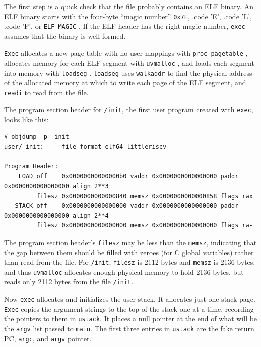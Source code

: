 The first step is a quick check that the file probably contains an
ELF binary.
An ELF binary starts with the four-byte ``magic number''
\lstinline{0x7F},
.code 'E',
.code 'L',
.code 'F',
or
\lstinline{ELF_MAGIC}
.
If the ELF header has the right magic number,
\lstinline{exec}
assumes that the binary is well-formed.

\lstinline{Exec}
allocates a new page table with no user mappings with
\lstinline{proc_pagetable}
,
allocates memory for each ELF segment with
\lstinline{uvmalloc}
,
and loads each segment into memory with
\lstinline{loadseg}
.
\lstinline{loadseg}
uses
\lstinline{walkaddr}
to find the physical address of the allocated memory at which to write
each page of the ELF segment, and
\lstinline{readi}
to read from the file.

The program section header for
\lstinline{/init},
the first user program created with
\lstinline{exec},
looks like this:
\begin{lstlisting}[]
# objdump -p _init
user/_init:     file format elf64-littleriscv

Program Header:
    LOAD off    0x00000000000000b0 vaddr 0x0000000000000000 paddr 0x0000000000000000 align 2**3
         filesz 0x0000000000000840 memsz 0x0000000000000858 flags rwx
   STACK off    0x0000000000000000 vaddr 0x0000000000000000 paddr 0x0000000000000000 align 2**4
         filesz 0x0000000000000000 memsz 0x0000000000000000 flags rw-
\end{lstlisting}

The program section header's
\lstinline{filesz}
may be less than the
\lstinline{memsz},
indicating that the gap between them should be filled
with zeroes (for C global variables) rather than read from the file.
For
\lstinline{/init},
\lstinline{filesz}
is 2112 bytes and
\lstinline{memsz}
is 2136 bytes,
and thus
\lstinline{uvmalloc}
allocates enough physical memory to hold 2136 bytes, but reads only 2112 bytes
from the file
\lstinline{/init}.

Now
\lstinline{exec}
allocates and initializes the user stack.
It allocates just one stack page.
\lstinline{Exec}
copies the argument strings to the top of the stack
one at a time, recording the pointers to them in
\lstinline{ustack}.
It places a null pointer at the end of what will be the
\lstinline{argv}
list passed to
\lstinline{main}.
The first three entries in
\lstinline{ustack}
are the fake return PC,
\lstinline{argc},
and
\lstinline{argv}
pointer.


